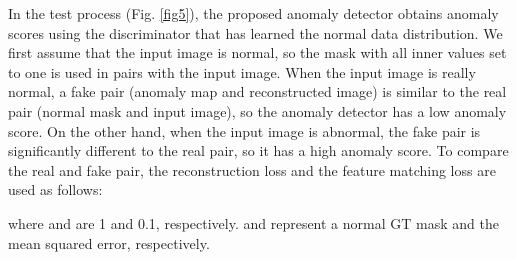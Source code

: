 \documentclass{article} \usepackage{iclr2022_conference,times}
\begin{document}
In the test process (Fig. \ref{fig5}), the proposed anomaly detector obtains anomaly scores using the discriminator that has learned the normal data distribution. We first assume that the input image is normal, so the mask  with all inner values set to one is used in pairs with the input image. When the input image is really normal, a fake pair (anomaly map and reconstructed image) is similar to the real pair (normal mask and input image), so the anomaly detector has a low anomaly score. On the other hand, when the input image is abnormal, the fake pair is significantly different to the real pair, so it has a high anomaly score. To compare the real and fake pair, the reconstruction loss and the feature matching loss are used as follows:

where  and  are 1 and 0.1, respectively.  and  represent a normal GT mask and the mean squared error, respectively.
\end{document}
